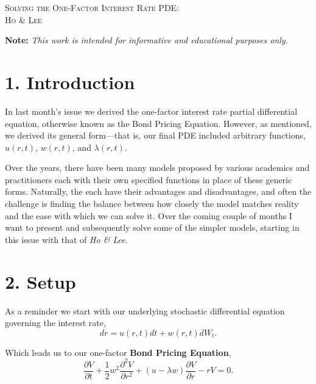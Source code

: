 \documentclass[11pt]{article}
\begin{document}

\begin{tcolorbox}
\begin{center}
    \large
    \textsc{Solving the One-Factor Interest Rate PDE: \\ Ho \& Lee}
\end{center}
\end{tcolorbox}

\begin{center}
\textbf{Note:} \textit{This work is intended for informative and educational purposes only.}
\end{center}

\section*{1. Introduction}
In last month's issue we derived the one-factor interest rate partial differential equation, otherwise known as the Bond Pricing Equation. However, as mentioned, we derived its general form––that is, our final PDE included arbitrary functions, $u(r,t)$, $w(r,t)$, and $\lambda(r,t)$. 

Over the years, there have been many models proposed by various academics and practitioners each with their own specified functions in place of these generic forms. Naturally, the each have their advantages and disadvantages, and often the challenge is finding the balance between how closely the model matches reality and the ease with which we can solve it. Over the coming couple of months I want to present and subsequently solve some of the simpler models, starting in this issue with that of \textit{Ho \& Lee}.

\section*{2. Setup}
As a reminder we start with our underlying stochastic differential equation governing the interest rate,
\begin{equation}
    dr = u(r,t)dt + w(r,t)dW_t.
\end{equation}

Which leads us to our one-factor \textbf{Bond Pricing Equation},
\begin{equation}
    \frac{\partial V}{\partial t} + \frac{1}{2} w^2 \frac{\partial^2 V}{\partial r^2} + (u - \lambda w) \frac{\partial V}{\partial r} - rV = 0.
\end{equation}
\end{document}
